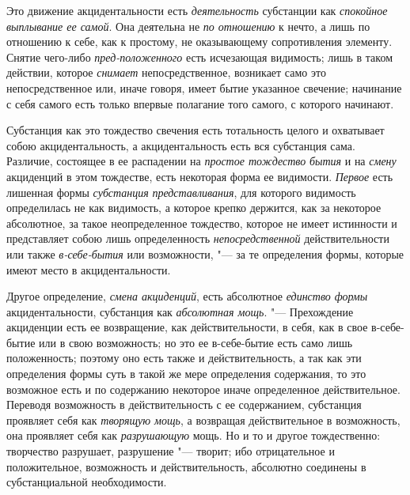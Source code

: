 Это движение акцидентальности есть {\em деятельность}
субстанции как {\em спокойное выплывание ее самой}. Она
деятельна не {\em по отношению} к нечто, а лишь по
отношению к себе, как к простому, не оказывающему сопротивления элементу.
Снятие чего-либо {\em пред-положенного} есть исчезающая
видимость; лишь в таком действии, которое {\em снимает}
непосредственное, возникает само это непосредственное или, иначе говоря,
имеет бытие указанное свечение; начинание с себя самого есть только впервые
полагание того самого, с которого начинают.

Субстанция как это тождество свечения есть тотальность целого и охватывает
собою акцидентальность, а акцидентальность есть вся субстанция сама.
Различие, состоящее в ее распадении на {\em простое
тождество} {\em бытия} и на
{\em смену} акциденций в этом тождестве, есть некоторая
форма ее видимости. {\em Первое} есть лишенная формы
{\em субстанция}
{\em представливания}, для которого видимость
определилась не как видимость, а которое крепко держится, как за некоторое
абсолютное, за такое неопределенное тождество, которое не имеет истинности
и представляет собою лишь определенность
{\em непосредственной} действительности или также
{\em в-себе-бытия} или возможности, "--- за те определения
формы, которые имеют место в акцидентальности.

Другое определение, {\em смена акциденций}, есть
абсолютное {\em единство формы} акцидентальности,
субстанция как {\em абсолютная мощь}. "--- Прехождение
акциденции есть ее возвращение, как действительности, в себя, как в свое
в-себе-бытие или в свою возможность; но это ее в-себе-бытие есть само лишь
положенность; поэтому оно есть также и действительность, а так как эти
определения формы суть в такой же мере определения содержания, то это
возможное есть и по содержанию некоторое иначе определенное действительное.
Переводя возможность в действительность с ее содержанием, субстанция
проявляет себя как {\em творящую мощь}, а возвращая
действительное в возможность, она проявляет себя как
{\em разрушающую} мощь. Но и то и другое тождественно:
творчество разрушает, разрушение "--- творит; ибо отрицательное и
положительное, возможность и действительность, абсолютно соединены в
субстанциальной необходимости.

